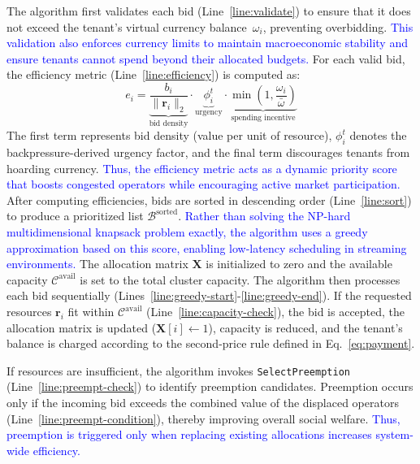 \documentclass[lettersize,journal]{IEEEtran}
\begin{document}
The algorithm first validates each bid (Line~\ref{line:validate}) to ensure that it does not exceed the tenant's virtual currency balance~$\omega_i$, preventing overbidding. \textcolor{blue}{This validation also enforces currency limits to maintain macroeconomic stability and ensure tenants cannot spend beyond their allocated budgets.} For each valid bid, the efficiency metric (Line~\ref{line:efficiency}) is computed as:
\begin{equation}
e_i =
\underbrace{\frac{b_i}{\|\mathbf{r}_i\|_2}}_{\text{bid density}} \cdot
\underbrace{\phi_i^t}_{\text{urgency}} \cdot
\underbrace{\min\left(1, \frac{\omega_i}{\bar{\omega}}\right)}_{\text{spending incentive}}
\end{equation}
The first term represents bid density (value per unit of resource), $\phi_i^t$ denotes the backpressure-derived urgency factor, and the final term discourages tenants from hoarding currency. \textcolor{blue}{Thus, the efficiency metric acts as a dynamic priority score that boosts congested operators while encouraging active market participation.}
After computing efficiencies, bids are sorted in descending order (Line~\ref{line:sort}) to produce a prioritized list $\mathcal{B}^{\text{sorted}}$. \textcolor{blue}{Rather than solving the NP-hard multidimensional knapsack problem exactly, the algorithm uses a greedy approximation based on this score, enabling low-latency scheduling in streaming environments.} The allocation matrix $\mathbf{X}$ is initialized to zero and the available capacity $\mathcal{C}^{\text{avail}}$ is set to the total cluster capacity.
The algorithm then processes each bid sequentially (Lines~\ref{line:greedy-start}-\ref{line:greedy-end}). If the requested resources $\mathbf{r}_i$ fit within $\mathcal{C}^{\text{avail}}$ (Line~\ref{line:capacity-check}), the bid is accepted, the allocation matrix is updated ($\mathbf{X}[i] \leftarrow 1$), capacity is reduced, and the tenant’s balance is charged according to the second-price rule defined in Eq.~\ref{eq:payment}.

If resources are insufficient, the algorithm invokes \texttt{SelectPreemption} (Line~\ref{line:preempt-check}) to identify preemption candidates. Preemption occurs only if the incoming bid exceeds the combined value of the displaced operators (Line~\ref{line:preempt-condition}), thereby improving overall social welfare. \textcolor{blue}{Thus, preemption is triggered only when replacing existing allocations increases system-wide efficiency.}
\end{document}
